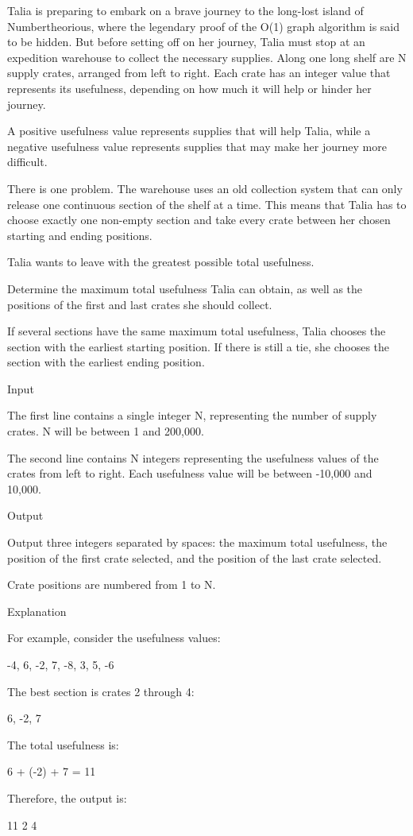 

Talia is preparing to embark on a brave journey to the long-lost island of Numbertheorious,
where the legendary proof of the O(1) graph algorithm is said to be hidden. But before setting
off on her journey, Talia must stop at an expedition warehouse to collect the necessary supplies.
Along one long shelf are N supply crates, arranged from left to right. Each crate has an integer
value that represents its usefulness, depending on how much it will help or hinder her journey.

A positive usefulness value represents supplies that will help Talia, while a negative usefulness
value represents supplies that may make her journey more difficult.

There is one problem. The warehouse uses an old collection system that can only release one
continuous section of the shelf at a time. This means that Talia has to choose exactly one
non-empty section and take every crate between her chosen starting and ending positions.

Talia wants to leave with the greatest possible total usefulness.

Determine the maximum total usefulness Talia can obtain, as well as the positions of the first
and last crates she should collect.

If several sections have the same maximum total usefulness, Talia chooses the section with the
earliest starting position. If there is still a tie, she chooses the section with the earliest
ending position.

Input

The first line contains a single integer N, representing the number of supply crates.
N will be between 1 and 200,000.

The second line contains N integers representing the usefulness values of the crates from left
to right. Each usefulness value will be between -10,000 and 10,000.

Output

Output three integers separated by spaces: the maximum total usefulness, the position of the
first crate selected, and the position of the last crate selected.

Crate positions are numbered from 1 to N.

Explanation

For example, consider the usefulness values:

-4, 6, -2, 7, -8, 3, 5, -6

The best section is crates 2 through 4:

6, -2, 7

The total usefulness is:

6 + (-2) + 7 = 11

Therefore, the output is:

11 2 4